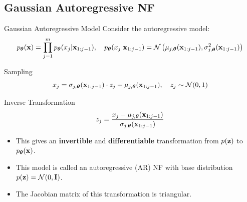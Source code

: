 \documentclass{beamer}
\begin{document}
\subsection{Gaussian Autoregressive NF}
\begin{frame}{Gaussian Autoregressive Model}
	Consider the autoregressive model:
	\vspace{-0.3cm}
	{\small
		\[
		p_{\boldsymbol{\theta}}(\mathbf{x}) = \prod_{j=1}^m p_{\boldsymbol{\theta}}(x_j | \mathbf{x}_{1:j-1}), \quad
		p_{\boldsymbol{\theta}}(x_j | \mathbf{x}_{1:j-1}) = \mathcal{N} \left(\mu_{j, \boldsymbol{\theta}}(\mathbf{x}_{1:j-1}), \sigma^2_{j, \boldsymbol{\theta}} (\mathbf{x}_{1:j-1})\right)
		\]
	}
	\vspace{-0.5cm}
	\eqpause
	\begin{block}{Sampling}
		\vspace{-0.3cm}
		\[
		x_j = \sigma_{j, \boldsymbol{\theta}} (\mathbf{x}_{1:j-1}) \cdot z_j + \mu_{j, \boldsymbol{\theta}}(\mathbf{x}_{1:j-1}), \quad z_j \sim \mathcal{N}(0, 1)
		\]
		\vspace{-0.7cm}
	\end{block}
	\eqpause
	\begin{block}{Inverse Transformation}
		\vspace{-0.5cm}
		\[
		z_j = \frac{x_j - \mu_{j, \boldsymbol{\theta}}(\mathbf{x}_{1:j-1})}{\sigma_{j, \boldsymbol{\theta}} (\mathbf{x}_{1:j-1}) }
		\]
		\vspace{-0.4cm}
	\end{block}
	\eqpause
	\begin{itemize}
		\item This gives an \textbf{invertible} and \textbf{differentiable} transformation from $p(\mathbf{z})$ to $p_{\boldsymbol{\theta}}(\mathbf{x})$.
		    \eqpause
		\item This model is called an autoregressive (AR) NF with base distribution $p(\mathbf{z}) = \mathcal{N}(0, \mathbf{I})$.
		    \eqpause
		\item The Jacobian matrix of this transformation is triangular.
	\end{itemize}
\end{frame}
\end{document}
